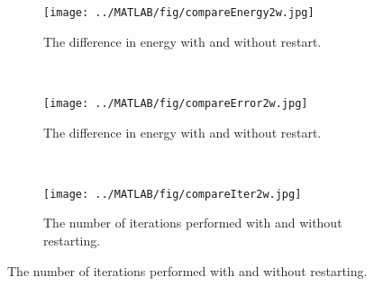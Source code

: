 \begin{figure}[H]
        \centering
        
        \begin{subfigure}[b]{0.3\textwidth}
                \texttt{[image: ../MATLAB/fig/compareEnergy2w.jpg]}
                \caption{ The difference in energy with and without restart. }
                \label{fig:compareEnergy2w}
        \end{subfigure}
        ~
        \begin{subfigure}[b]{0.3\textwidth}
                \texttt{[image: ../MATLAB/fig/compareError2w.jpg]}
                \caption{ The difference in energy with and without restart. }
                \label{fig:compareError2w}
        \end{subfigure}
        ~
        \begin{subfigure}[b]{0.3\textwidth}
                \texttt{[image: ../MATLAB/fig/compareIter2w.jpg]}
                \caption{ The number of iterations performed with and without restarting.  }
                \label{fig:compareIter2w}
        \end{subfigure}
        

\end{figure}
